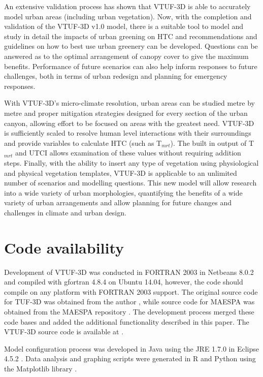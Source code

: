 \documentclass[final,3p,times,authoryear]{elsarticle}
\begin{document}
An extensive validation process has shown that VTUF-3D is able to accurately model urban areas (including urban vegetation). Now, with the completion and validation of the VTUF-3D v1.0 model, there is a suitable tool to model and study in detail the impacts of urban greening on HTC and recommendations and guidelines on how to best use urban greenery can be developed. Questions can be answered as to the optimal arrangement of canopy cover to give the maximum benefits. Performance of future scenarios can also help inform responses to future challenges, both in terms of urban redesign and planning for emergency responses.

With VTUF-3D's micro-climate resolution, urban areas can be studied metre by metre and proper mitigation strategies designed for every section of the urban canyon, allowing effort to be focused on areas with the greatest need. VTUF-3D is sufficiently scaled to resolve human level interactions with their surroundings and provide variables to calculate HTC (such as T$_{mrt}$). The built in output of T$_{mrt}$ and UTCI allows examination of these values without requiring addition steps. Finally, with the ability to insert any type of vegetation using physiological and physical vegetation templates, VTUF-3D is applicable to an unlimited number of scenarios and modelling questions. This new model will allow research into a wide variety of urban morphologies, quantifying the benefits of a wide variety of urban arrangements and allow planning for future changes and challenges in climate and urban design.

\section{Code availability}\label{sec:available}

Development of VTUF-3D was conducted in FORTRAN 2003 \citep{GNU2016a} in Netbeans 8.0.2 \citep{Netbeans2016} and compiled with gfortran 4.8.4 \citep{GNU2016} on Ubuntu 14.04, however, the code should compile on any platform with FORTRAN 2003 support. The original source code for TUF-3D was obtained from the author \citep{Krayenhoff2007}, while source code for MAESPA was obtained from the MAESPA repository \citep{Duursma2016}. The development process merged these code bases and added the additional functionality described in this paper. The VTUF-3D source code is available at \cite{Nice2016c}.

Model configuration process was developed in Java using the JRE 1.7.0 \citep{Oracle2016} in Eclipse 4.5.2 \citep{Eclipse2016}. Data analysis and graphing scripts were generated in R \citep{R2013} and Python \citep{Python2016} using the Matplotlib library \citep{Hunter2007}. 
\end{document}

